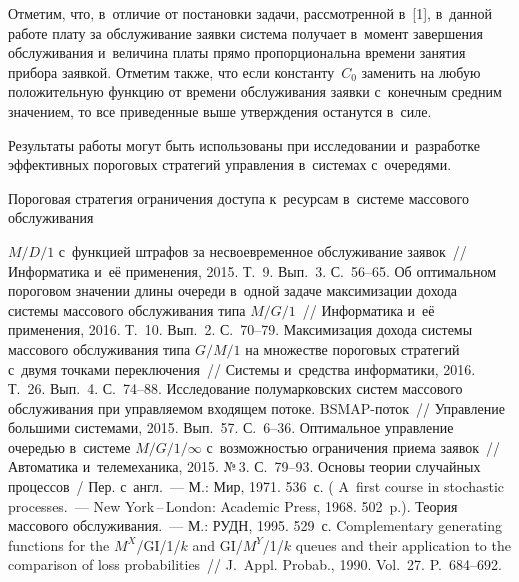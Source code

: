 \begin{multicols}{2}
  Отметим, что, в~отличие от постановки задачи, рассмотренной в~[1], 
в~данной работе плату за обслуживание заявки система получает в~момент 
завершения обслуживания и~величина платы прямо пропорциональна времени 
занятия прибора заявкой. Отметим также, что если константу~$C_0$ заменить 
на любую положительную функцию от времени обслуживания заявки 
с~конечным средним значением, то все приведенные выше утверждения 
останутся в~силе.
  
  Результаты работы могут быть использованы при исследовании и~разработке 
эффективных пороговых стратегий управления в~системах с~очередями.

\vspace*{-3pt}
  
{\small\frenchspacing
 {%
 \begin{thebibliography}{9}
 Пороговая стратегия ограничения доступа к~ресурсам 
в~системе массового обслуживания\linebreak\vspace*{-10pt}

\columnbreak

\noindent
 $M/D/1$ с~функцией штрафов
 за несвоевременное обслуживание 
заявок~// Информатика и~её применения, 2015. Т.~9. Вып.~3. С.~56--65.
 Об оптимальном 
пороговом значении длины очереди в~одной задаче максимизации дохода 
системы массового обслуживания 
типа $M/G/1$~// Информатика и~её применения, 2016. Т.~10. Вып.~2. С.~70--79.
 Максимизация дохода 
системы массового обслуживания типа $G/M/1$ на множестве пороговых стратегий с~двумя точками 
переключения~// Системы и~средства информатики, 2016. Т.~26. Вып.~4. 
С.~74--88.
 Исследование полумарковских 
систем массового обслуживания при управляемом входящем потоке.  
BSMAP-поток~// Управление большими системами, 2015. Вып.~57. 
С.~6--36. 
 Оптимальное управление очередью в~системе 
$M/G/1/\infty$ с~возможностью ограничения приема заявок~// Автоматика 
и~телемеханика, 2015. №\,3. С.~79--93. 
 Основы теории случайных процессов~/ Пер. с~англ.~--- М.: 
Мир, 1971. 536~с. ( A~first course in stochastic processes.~--- New 
York\,--\,London: Academic Press, 1968. 502~p.). 
 Теория массового обслуживания.~--- М.: 
РУДН, 1995. 529~с.
 Complementary generating functions for the $M^X$/GI/1/$k$ and 
GI/$M^Y$/1/$k$ queues and their application to the comparison of loss probabilities~// 
J.~Appl. Probab., 1990. Vol.~27. P.~684--692.
 \end{thebibliography}

 }
 }

\end{multicols}

